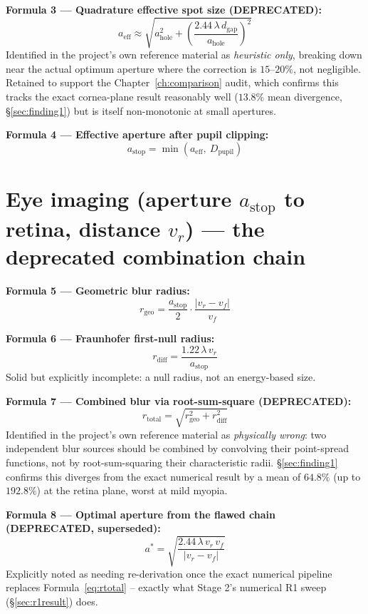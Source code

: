 \documentclass[11pt]{report}
\newcommand{\ahole}{a_{\text{hole}}}
\newcommand{\aeff}{a_{\text{eff}}}
\newcommand{\astop}{a_{\text{stop}}}
\newcommand{\dgap}{d_{\text{gap}}}
\newcommand{\vr}{v_r}
\newcommand{\vf}{v_f}
\newcommand{\rgeo}{r_{\text{geo}}}
\newcommand{\rdiff}{r_{\text{diff}}}
\newcommand{\rtotal}{r_{\text{total}}}
\newcommand{\Dpupil}{D_{\text{pupil}}}
\begin{document}
\textbf{Formula 3 --- Quadrature effective spot size (DEPRECATED):}
\begin{equation}
\aeff \approx \sqrt{\ahole^2 + \left(\frac{2.44\,\lambda\,\dgap}{\ahole}\right)^2}
\label{eq:aeff}
\end{equation}
Identified in the project's own reference material as \emph{heuristic only}, breaking down near the actual optimum aperture where the correction is $15$--$20\%$, not negligible. Retained to support the Chapter~\ref{ch:comparison} audit, which confirms this tracks the exact cornea-plane result reasonably well ($13.8\%$ mean divergence, \S\ref{sec:finding1}) but is itself non-monotonic at small apertures.

\textbf{Formula 4 --- Effective aperture after pupil clipping:}
\begin{equation}
\astop = \min(\aeff,\ \Dpupil)
\label{eq:astop}
\end{equation}

\section{Eye imaging (aperture $\astop$ to retina, distance $\vr$) --- the deprecated combination chain}

\textbf{Formula 5 --- Geometric blur radius:}
\begin{equation}
\rgeo = \frac{\astop}{2}\cdot\frac{|\vr - \vf|}{\vf}
\label{eq:rgeo}
\end{equation}

\textbf{Formula 6 --- Fraunhofer first-null radius:}
\begin{equation}
\rdiff = \frac{1.22\,\lambda\,\vr}{\astop}
\label{eq:rdiff}
\end{equation}
Solid but explicitly incomplete: a null radius, not an energy-based size.

\textbf{Formula 7 --- Combined blur via root-sum-square (DEPRECATED):}
\begin{equation}
\rtotal = \sqrt{\rgeo^2 + \rdiff^2}
\label{eq:rtotal}
\end{equation}
Identified in the project's own reference material as \emph{physically wrong}: two independent blur sources should be combined by convolving their point-spread functions, not by root-sum-squaring their characteristic radii. \S\ref{sec:finding1} confirms this diverges from the exact numerical result by a mean of $64.8\%$ (up to $192.8\%$) at the retina plane, worst at mild myopia.

\textbf{Formula 8 --- Optimal aperture from the flawed chain (DEPRECATED, superseded):}
\begin{equation}
a^{*} = \sqrt{\frac{2.44\,\lambda\,\vr\,\vf}{|\vr - \vf|}}
\label{eq:astar}
\end{equation}
Explicitly noted as needing re-derivation once the exact numerical pipeline replaces Formula~\ref{eq:rtotal} -- exactly what Stage 2's numerical R1 sweep (\S\ref{sec:r1result}) does.
\end{document}
